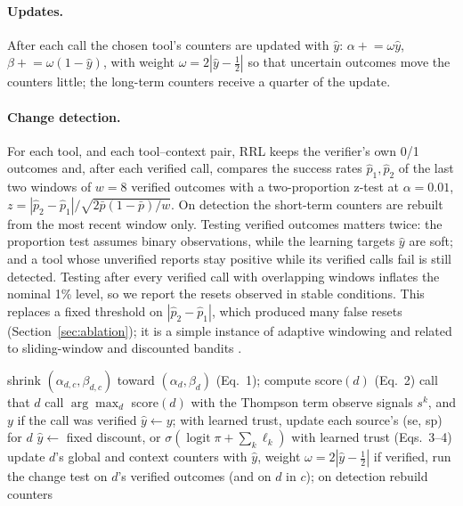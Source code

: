 \documentclass[11pt]{article}
\begin{document}
\paragraph{Updates.} After each call the chosen tool's counters are updated with $\hat y$:
$\alpha\mathrel{+}=\omega \hat y$, $\beta\mathrel{+}=\omega(1-\hat y)$, with weight
$\omega=2|\hat y-\tfrac12|$ so that uncertain outcomes move the counters little; the long-term
counters receive a quarter of the update.

\paragraph{Change detection.} For each tool, and each tool--context pair, RRL keeps the
verifier's own 0/1 outcomes and, after each verified call, compares the success rates
$\hat p_1,\hat p_2$ of the last two windows of $w=8$ verified outcomes with a two-proportion
z-test at $\alpha=0.01$, $z=|\hat p_2-\hat p_1|/\sqrt{2\bar p(1-\bar p)/w}$. On detection the
short-term counters are rebuilt from the most recent window only. Testing verified outcomes
matters twice: the proportion test assumes binary observations, while the learning targets
$\hat y$ are soft; and a tool whose unverified reports stay positive while its verified calls
fail is still detected. Testing after every verified call with overlapping windows inflates
the nominal 1\% level, so we report the resets observed in stable conditions. This replaces a fixed threshold
on $|\hat p_2-\hat p_1|$, which produced many false resets (Section~\ref{sec:ablation}); it is a
simple instance of adaptive windowing \citep{bifet2007} and related to sliding-window and
discounted bandits \citep{garivier,dts}.

\begin{algorithm}[t]
\caption{One RRL step for request $q$ in context $c$}
\label{alg:rrl}
\begin{algorithmic}[1]
  \State shrink $(\alpha_{d,c},\beta_{d,c})$ toward $(\alpha_d,\beta_d)$ (Eq.~1); compute score$(d)$ (Eq.~2)
\EndFor
{}
  \State call that $d$ 
\Else
  \State call $\arg\max_d$ score$(d)$ with the Thompson term
\EndIf
\State observe signals $s^k$, and $y$ if the call was verified
 \State $\hat y\gets y$; with learned trust, update each source's (se, sp) for $d$
\Else \State $\hat y\gets$ fixed discount, or $\sigma(\operatorname{logit}\pi+\sum_k\ell_k)$ with learned trust (Eqs.~3--4)
\EndIf
\State update $d$'s global and context counters with $\hat y$, weight $\omega=2|\hat y-\tfrac12|$
\State if verified, run the change test on $d$'s verified outcomes (and on $d$ in $c$); on detection rebuild counters
\end{algorithmic}
\end{algorithm}
\end{document}
